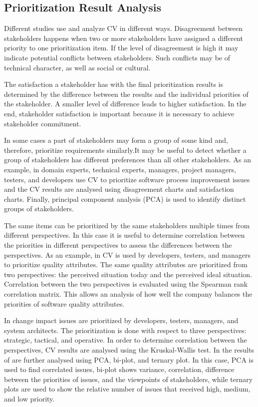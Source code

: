 \subsection{Prioritization Result Analysis}

Different studies use and analyze CV in different ways. Disagreement
between stakeholders happens when two or more stakeholders have assigned
a different priority to one prioritization item. If the level of disagreement
is high it may indicate potential conflicts between stakeholders.
Such conflicts may be of technical character, as well as social or cultural.

The satisfaction a stakeholder has with the final prioritization results is
determined by the difference between the results and the individual priorities
of the stakeholder. A smaller level of difference leads to higher satisfaction.
In the end, stakeholder satisfaction is important because it is necessary to achieve
stakeholder commitment.

In some cases a part of stakeholders may form a group of some kind and, therefore, prioritize
requirements similarly.It may be useful
to detect whether a group of stakeholders has different preferences
than all other stakeholders. As an example, in \citep{Pettersson2008} domain experts,
technical experts, managers, project managers, testers, and developers
use CV to prioritize software process improvement issues and the CV results
are analysed using disagreement charts and satisfaction charts.
Finally, principal component analysis (PCA) is used to identify distinct
groups of stakeholders.

The same items can be prioritized by the same stakeholders multiple times
from different perspectives. In this case it is useful to determine correlation between
the priorities in different perspectives to assess the differences
between the perspectives. As an example, in \citep{Barney2009b} CV is used by developers,
testers, and managers to prioritize quality attributes. The same quality
attributes are prioritized from two perspectives: the perceived situation
today and the perceived ideal situation. Correlation between the two perspectives
is evaluated using the Spearman rank correlation matrix. This allows an analysis of
how well the company balances the priorities of software quality attributes.

In \citep{Jonsson2005} change impact issues are prioritized by developers,
testers, managers, and system architects. The prioritization is done
with respect to three perspectives: strategic, tactical, and operative.
In order to determine correlation between the perspectives, CV results are
analysed using the Kruskal-Wallis test. In \citep{Chatzipetrou2010} the
results of \citep{Jonsson2005} are further analysed using PCA, bi-plot, and
ternary plot. In this case, PCA is used to find correlated issues, 
bi-plot shows variance, correlation, difference between
the priorities of issues, and the viewpoints of stakeholders, while ternary
plots are used to show the relative number of issues that received high,
medium, and low priority.

